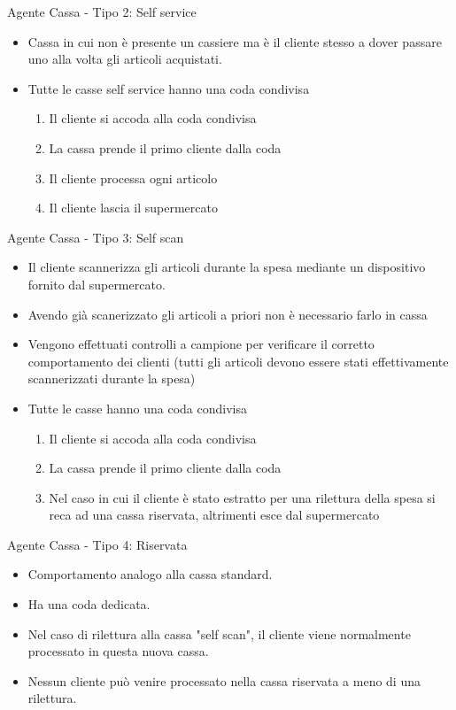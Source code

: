 \begin{frame}{Agente Cassa - Tipo 2: Self service}
	
	\begin{itemize}
		\item Cassa in cui non è presente un cassiere ma è il cliente stesso a dover passare uno alla volta gli articoli acquistati.
		\item Tutte le casse self service hanno una coda condivisa
		\begin{enumerate}
			\item Il cliente si accoda alla coda condivisa
			\item La cassa prende il primo cliente dalla coda
			\item Il cliente processa ogni articolo
			\item Il cliente lascia il supermercato
		\end{enumerate}		
	\end{itemize}
\end{frame}

\begin{frame}{Agente Cassa - Tipo 3: Self scan}
	
	\begin{itemize}
		\item Il cliente scannerizza gli articoli durante la spesa mediante un dispositivo fornito dal supermercato.
		\item Avendo già scanerizzato gli articoli a priori non è necessario farlo in cassa
		\item Vengono effettuati controlli a campione per verificare il corretto comportamento dei clienti (tutti gli articoli devono essere stati effettivamente scannerizzati durante la spesa)
		\item Tutte le casse hanno una coda condivisa
		\begin{enumerate}
			\item Il cliente si accoda alla coda condivisa
			\item La cassa prende il primo cliente dalla coda
			\item Nel caso in cui il cliente è stato estratto per una rilettura della spesa si reca ad una cassa riservata, altrimenti esce dal supermercato
		\end{enumerate}		
	\end{itemize}
\end{frame}

\begin{frame}{Agente Cassa - Tipo 4: Riservata}
	
	\begin{itemize}
		\item Comportamento analogo alla cassa standard.
		\item Ha una coda dedicata.
		\item Nel caso di rilettura alla cassa "self scan", il cliente viene normalmente processato in questa nuova cassa.
		\item Nessun cliente può venire processato nella cassa riservata a meno di una rilettura.
	\end{itemize}
\end{frame}


